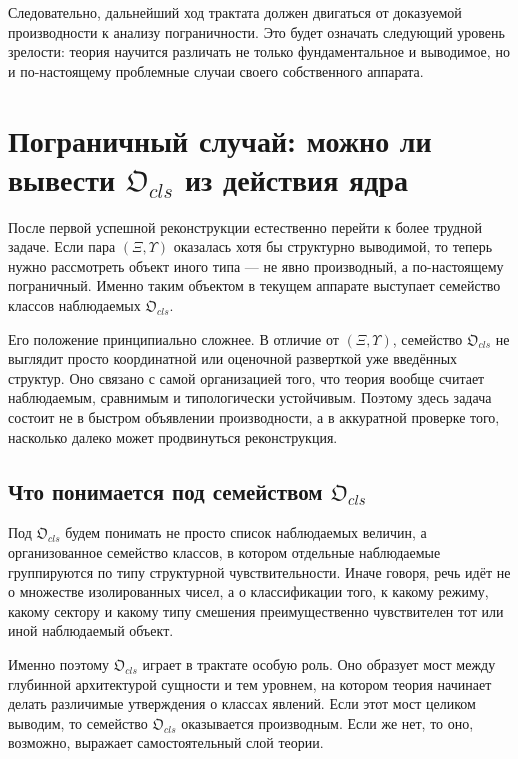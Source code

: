 \documentclass[12pt,a4paper]{article}
\begin{document}
Следовательно, дальнейший ход трактата должен двигаться от доказуемой производности к анализу пограничности. Это будет означать следующий уровень зрелости: теория научится различать не только фундаментальное и выводимое, но и по-настоящему проблемные случаи своего собственного аппарата.

\section{Пограничный случай: можно ли вывести \texorpdfstring{$\mathfrak{O}_{cls}$}{Ocls} из действия ядра}

После первой успешной реконструкции естественно перейти к более трудной задаче. Если пара \((\Xi,\Upsilon)\) оказалась хотя бы структурно выводимой, то теперь нужно рассмотреть объект иного типа --- не явно производный, а по-настоящему пограничный. Именно таким объектом в текущем аппарате выступает семейство классов наблюдаемых \(\mathfrak{O}_{cls}\).

Его положение принципиально сложнее. В отличие от \((\Xi,\Upsilon)\), семейство \(\mathfrak{O}_{cls}\) не выглядит просто координатной или оценочной разверткой уже введённых структур. Оно связано с самой организацией того, что теория вообще считает наблюдаемым, сравнимым и типологически устойчивым. Поэтому здесь задача состоит не в быстром объявлении производности, а в аккуратной проверке того, насколько далеко может продвинуться реконструкция.

\subsection{Что понимается под семейством \texorpdfstring{$\mathfrak{O}_{cls}$}{Ocls}}

Под \(\mathfrak{O}_{cls}\) будем понимать не просто список наблюдаемых величин, а организованное семейство классов, в котором отдельные наблюдаемые группируются по типу структурной чувствительности. Иначе говоря, речь идёт не о множестве изолированных чисел, а о классификации того, к какому режиму, какому сектору и какому типу смешения преимущественно чувствителен тот или иной наблюдаемый объект.

Именно поэтому \(\mathfrak{O}_{cls}\) играет в трактате особую роль. Оно образует мост между глубинной архитектурой сущности и тем уровнем, на котором теория начинает делать различимые утверждения о классах явлений. Если этот мост целиком выводим, то семейство \(\mathfrak{O}_{cls}\) оказывается производным. Если же нет, то оно, возможно, выражает самостоятельный слой теории.
\end{document}
